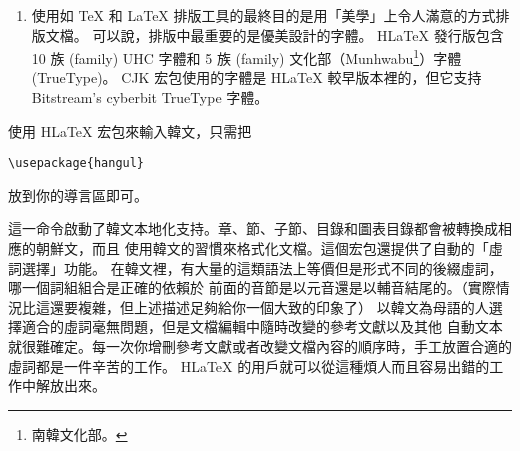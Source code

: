 \begin{enumerate}
\item 使用如 \TeX{} 和 \LaTeX{} 排版工具的最終目的是用「美學」上令人滿意的方式排版文檔。
可以說，排版中最重要的是優美設計的字體。
H\LaTeX{} 發行版包含 10 族 (family)  UHC \PSi{} 字體和 5 族 (family) 文化部（Munhwabu\footnote{南韓文化部。}）字體 (TrueType)。
CJK 宏包使用的字體是 H\LaTeX{} 較早版本裡的，但它支持 Bitstream's
cyberbit TrueType 字體。
\end{enumerate}

使用 H\LaTeX{} 宏包來輸入韓文，只需把
\begin{lscommand}
\verb+\usepackage{hangul}+
\end{lscommand}
\noindent 放到你的導言區即可。

這一命令啟動了韓文本地化支持。章、節、子節、目錄和圖表目錄都會被轉換成相應的朝鮮文，而且
使用韓文的習慣來格式化文檔。這個宏包還提供了自動的「虛詞選擇」功能。
在韓文裡，有大量的這類語法上等價但是形式不同的後綴虛詞，哪一個詞組組合是正確的依賴於
前面的音節是以元音還是以輔音結尾的。（實際情況比這還要複雜，但上述描述足夠給你一個大致的印象了）
以韓文為母語的人選擇適合的虛詞毫無問題，但是文檔編輯中隨時改變的參考文獻以及其他
自動文本就很難確定。每一次你增刪參考文獻或者改變文檔內容的順序時，手工放置合適的虛詞都是一件辛苦的工作。
H\LaTeX{} 的用戶就可以從這種煩人而且容易出錯的工作中解放出來。

